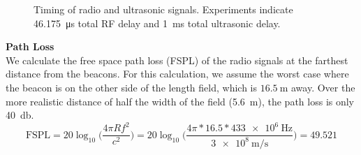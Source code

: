 \documentclass{article}
\begin{document}
      \begin{figure}
        \centering
        \caption{Timing of radio and ultrasonic signals. Experiments indicate \SI{46.175}{\micro\second} total RF delay and \SI{1}{\milli\second} total ultrasonic delay.}
        \label{fig:rx_tx_timing}
      \end{figure}

      \textbf{Path Loss} \\
      We calculate the free space path loss (FSPL) of the radio signals at the farthest distance from the beacons. For this calculation, we assume the worst case where the beacon is on the other side of the length field, which is $\SI{16.5}{\meter}$ away. Over the more realistic distance of half the width of the field (\SI{5.6}{\meter}), the path loss is only \SI{40}{\decibel}. \\
      $$ \text{FSPL} = 20\log_{10}\Bigg(\frac{4\pi Rf^2}{c^2}\Bigg) = 20\log_{10}\Bigg(\frac{4\pi*16.5*\SI{433e6}{\hertz}}{\SI{3e8}{\meter\per\second}}\Bigg) = 49.521 $$
\end{document}
